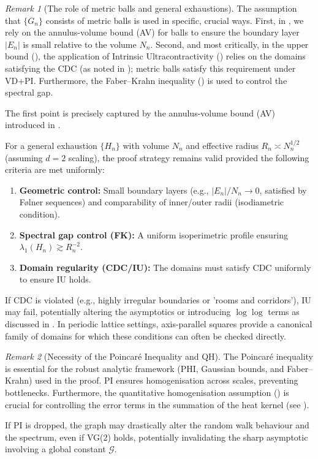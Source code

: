 \documentclass[reqno]{amsart}
\numberwithin{equation}{section}
\theoremstyle{definition}
\theoremstyle{remark}
\newtheorem{remark}[remark]{Remark}
\newcommand{\cG}{\mathcal{G}}
\begin{document}
\begin{remark}[The role of metric balls and general exhaustions]\label{rem:general_exhaustions}
The assumption that $\{G_n\}$ consists of metric balls is used in specific, crucial ways. First, in , we rely on the annulus-volume bound (AV) for balls to ensure the boundary layer $|E_n|$ is small relative to the volume $N_n$. Second, and most critically, in the upper bound (), the application of Intrinsic Ultracontractivity () relies on the domains satisfying the CDC (as noted in ); metric balls satisfy this requirement under VD+PI. Furthermore, the Faber--Krahn inequality () is used to control the spectral gap.

The first point is precisely captured by the annulus-volume bound (AV) introduced in .

For a general exhaustion $\{H_n\}$ with volume $N_n$ and effective radius $R_n \asymp N_n^{1/2}$ (assuming $d=2$ scaling), the proof strategy remains valid provided the following criteria are met uniformly:
\begin{enumerate}
    \item \textbf{Geometric control:} Small boundary layers (e.g., $|E_n|/N_n \to 0$, satisfied by Følner sequences) and comparability of inner/outer radii (isodiametric condition).
    \item \textbf{Spectral gap control (FK):} A uniform isoperimetric profile ensuring $\lambda_1(H_n) \gtrsim R_n^{-2}$.
    \item \textbf{Domain regularity (CDC/IU):} The domains must satisfy CDC uniformly to ensure IU holds.
\end{enumerate}
If CDC is violated (e.g., highly irregular boundaries or 'rooms and corridors'), IU may fail, potentially altering the asymptotics or introducing $\log\log$ terms as discussed in . In periodic lattice settings, axis-parallel squares provide a canonical family of domains for which these conditions can often be checked directly.
\end{remark}

\begin{remark}[Necessity of the Poincaré Inequality and QH]
The Poincaré inequality is essential for the robust analytic framework (PHI, Gaussian bounds, and Faber--Krahn) used in the proof. PI ensures homogenisation across scales, preventing bottlenecks. Furthermore, the quantitative homogenisation assumption () is crucial for controlling the error terms in the summation of the heat kernel (see ).

If PI is dropped, the graph may drastically alter the random walk behaviour and the spectrum, even if VG(2) holds, potentially invalidating the sharp asymptotic involving a global constant $\cG$.
\end{remark}
\end{document}
